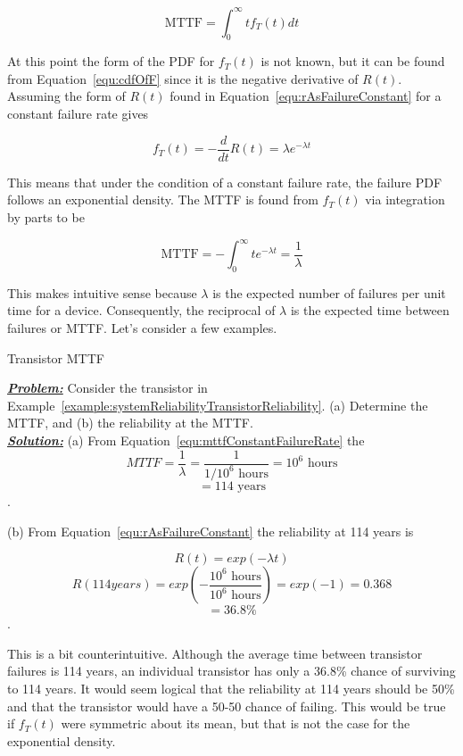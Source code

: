 {\begin{equation}
\label{equ:mttfIntegral}
\text{MTTF} = \int^\infty_0 t f_T(t) dt 
\end{equation}

At this point the form of the PDF for $f_T(t)$ is not known, but it can be
found from Equation~\ref{equ:cdfOfF} since it is the negative derivative 
of $R(t)$. Assuming the form of $R(t)$ found in 
Equation~\ref{equ:rAsFailureConstant} for a constant failure rate gives

\begin{equation}
\label{equ:mttfConstantFailureRate}
f_T(t) = -\frac{d}{dt}R(t) = \lambda e^{-\lambda t}
\end{equation}

This means that under the condition of a constant failure rate, the
failure PDF follows an exponential density. The MTTF is found from
$f_T(t)$ via integration by parts to be

\begin{equation}
\label{equ:mttfConstantFailureRate}
\text{MTTF} = -\int^\infty_0 t e^{-\lambda t} = \frac{1}{\lambda}
\end{equation}

This makes intuitive sense because $\lambda$ is the expected number of
failures per unit time for a device. Consequently, the reciprocal of
$\lambda$ is the expected time between failures or MTTF. Let's consider a
few examples.

\begin{example}{Transistor MTTF}
\label{example:systemReliabilityMttf}

\emph{\textbf{\ul{Problem:}}} Consider the transistor in 
Example~\ref{example:systemReliabilityTransistorReliability}.
(a) Determine the MTTF, and (b) the reliability at the MTTF.\\

\noindent\emph{\textbf{\ul{Solution:}}}
(a) From Equation~\ref{equ:mttfConstantFailureRate} the 
$$MTTF =\frac{1}{\lambda} = \frac{1}{1/10^6 \text{ hours}} = 10^6 \text{ hours} $$
$$		= 114 \text{ years} $$.

(b) From Equation~\ref{equ:rAsFailureConstant} the reliability at 114 years is

$$R(t) = exp(-\lambda t) $$
$$	R(114 years) = exp( -\frac{10^6 \text{ hours}}{10^6 \text{ hours}} ) = exp(-1) = 0.368 $$
$$	= 36.8\%$$.
\end{example}

This is a bit counterintuitive. Although the average time between
transistor failures is 114 years, an individual transistor has only a
36.8\% chance of surviving to 114 years. It would seem logical that the
reliability at 114 years should be 50\% and that the transistor would
have a 50-50 chance of failing. This would be true if $f_T(t)$
were symmetric about its mean,
but that is not the case for the exponential density.

}
